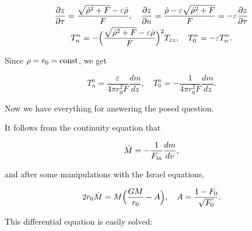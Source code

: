 \begin{gather}

 \label{transf}

 \frac{\partial z}{\partial \tau} = \frac{\sqrt{\dot\rho^2 + F} - \varepsilon \dot\rho}{F} ,

 \quad

 \frac{\partial z}{\partial n} = \frac{\dot \rho - \varepsilon \sqrt{\dot\rho^2 + F}}{F} = - \varepsilon \frac{\partial z}{\partial \tau}

\\

 \label{tnn}

 T^n_n = - \Bigl(\frac {\sqrt{\dot\rho^2 + F} - \varepsilon \dot\rho}{F} \Bigr)^2 T_{zz}, \quad

 T^n_0 = - \varepsilon T^n_n .

 \end{gather}

 Since $\rho = r_0 = \rm const$, we get

 \begin{equation}

 \label{fintnn}

 T^n_n = \frac{\varepsilon}{4  \pi r_0^2  F} \frac{dm}{dz} , \quad 

 T^n_0 = - \frac{1}{4 \pi r_0^2  F} \frac{dm}{dz}  .

 \end{equation}



Now we have everything for answering the posed question. 

It follows from the continuity equation that

 \begin{equation}

 \label{conteqM}

 \dot M = - \frac{1}{F_{\rm in}} \frac{dm}{dv} ,

\end{equation}

and after some manipulations with the Israel equations,

\begin{equation}

 \label{eqM}

 2 r_0 \dot M = M \Bigl( \frac{G M}{r_0} - A \Bigr) , \quad 

 A = \frac{1 - F_0}{\sqrt{F_0}} .

\end{equation}

 This differential equation is easily solved:

